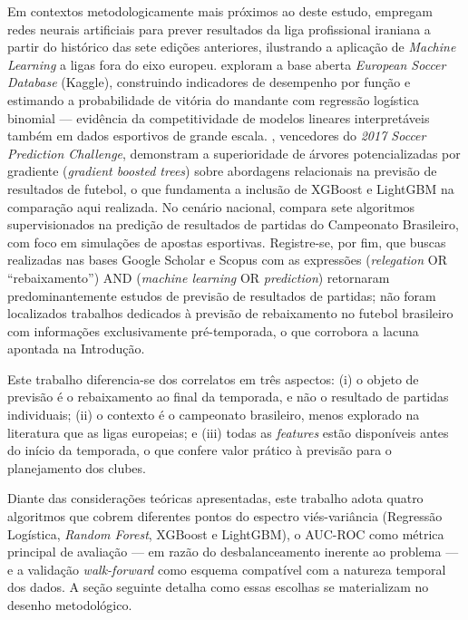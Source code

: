 \documentclass[
    article,
    12pt,
    oneside,
    a4paper,
    english,
    brazilian
    ]{abntex2}
\begin{document}
Em contextos metodologicamente mais próximos ao deste estudo,  empregam redes neurais artificiais para prever resultados da liga profissional iraniana a partir do histórico das sete edições anteriores, ilustrando a aplicação de \textit{Machine Learning} a ligas fora do eixo europeu.  exploram a base aberta \textit{European Soccer Database} (Kaggle), construindo indicadores de desempenho por função e estimando a probabilidade de vitória do mandante com regressão logística binomial --- evidência da competitividade de modelos lineares interpretáveis também em dados esportivos de grande escala. , vencedores do \textit{2017 Soccer Prediction Challenge}, demonstram a superioridade de árvores potencializadas por gradiente (\textit{gradient boosted trees}) sobre abordagens relacionais na previsão de resultados de futebol, o que fundamenta a inclusão de XGBoost e LightGBM na comparação aqui realizada. No cenário nacional,  compara sete algoritmos supervisionados na predição de resultados de partidas do Campeonato Brasileiro, com foco em simulações de apostas esportivas. Registre-se, por fim, que buscas realizadas nas bases Google Scholar e Scopus com as expressões (\textit{relegation} OR ``rebaixamento'') AND (\textit{machine learning} OR \textit{prediction}) retornaram predominantemente estudos de previsão de resultados de partidas; não foram localizados trabalhos dedicados à previsão de rebaixamento no futebol brasileiro com informações exclusivamente pré-temporada, o que corrobora a lacuna apontada na Introdução.

Este trabalho diferencia-se dos correlatos em três aspectos: (i) o objeto de previsão é o rebaixamento ao final da temporada, e não o resultado de partidas individuais; (ii) o contexto é o campeonato brasileiro, menos explorado na literatura que as ligas europeias; e (iii) todas as \textit{features} estão disponíveis antes do início da temporada, o que confere valor prático à previsão para o planejamento dos clubes.

Diante das considerações teóricas apresentadas, este trabalho adota quatro algoritmos que cobrem diferentes pontos do espectro viés-variância (Regressão Logística, \textit{Random Forest}, XGBoost e LightGBM), o AUC-ROC como métrica principal de avaliação --- em razão do desbalanceamento inerente ao problema --- e a validação \textit{walk-forward} como esquema compatível com a natureza temporal dos dados. A seção seguinte detalha como essas escolhas se materializam no desenho metodológico.
\end{document}
